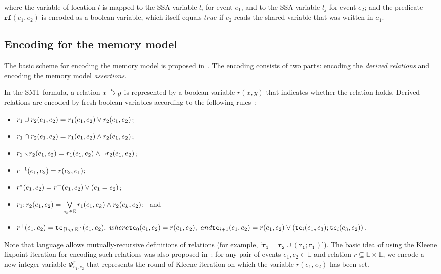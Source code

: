 where the variable of location $l$ is mapped to the SSA-variable $l_i$ for event $e_1$, and to the SSA-variable $l_j$ for event $e_2$; and the predicate $\texttt{rf}(e_1, e_2)$ is encoded as a boolean variable, which itself equals $true$ if $e_2$ reads the shared variable that was written in $e_1$.


\subsection{Encoding for the memory model} %
\label{ch:enc:bmc:wmm}

The basic scheme for encoding the memory model is proposed in~\cite{Porthos17a}.
The encoding consists of two parts: encoding the \textit{derived relations} and encoding the memory model \textit{assertions}.

In the SMT-formula, a relation $x \overset{\texttt{r}}{\rightarrow} y$ is represented by a boolean variable $r(x, y)$ that indicates whether the relation holds.
Derived relations are encoded by fresh boolean variables according to the following rules~\cite{Porthos17b}:
\begin{itemize}[noitemsep,topsep=0pt]
\item $r_1 \cup r_2(e_1, e_2) = r_1(e_1, e_2) \lor r_2(e_1, e_2)$;
\item $r_1 \cap r_2(e_1, e_2) = r_1(e_1, e_2) \land r_2(e_1, e_2)$;
\item $r_1 \!\smallsetminus\! r_2(e_1, e_2) = r_1(e_1, e_2) \land \neg r_2(e_1, e_2)$;
\item $r^{-1}(e_1, e_2) = r(e_2, e_1)$;
\item $r^{*}(e_1, e_2) = r^{+}(e_1, e_2) \lor (e_1 = e_2)$;
\item $r_1;r_2(e_1,e_2) = \bigvee\limits_{e_k \in \mathbb{E}}^{} r_1(e_1,e_k) \land r_2(e_k,e_2)$; \ and
\item $r^{+}(e_1, e_2) \defeq \texttt{tc}_{\left\lceil log|\mathbb{E}| \right\rceil} (e_1, e_2), \ where \vspace{0.25em} \\
\texttt{tc}_{0}(e_1,e_2) \defeq r(e_1,e_2), \ and \\
\texttt{tc}_{i+1}(e_1,e_2) \defeq r(e_1,e_2) \lor (\texttt{tc}_{i}(e_1,e_3);\texttt{tc}_{i}(e_3,e_2))$.
\end{itemize}
\vspace{1em}

Note that \cat{} language allows mutually-recursive definitions of relations (for example, `$\texttt{r}_\texttt{1} = \texttt{r}_\texttt{2} \cup (\texttt{r}_\texttt{1}; \texttt{r}_\texttt{1})$').
The basic idea of using the Kleene fixpoint iteration for encoding such relations was also proposed in~\cite{Porthos17a}: for any pair of events $e_1,e_2 \in \mathbb{E}$ and relation $r \subseteq \mathbb{E} \times \mathbb{E}$, we encode a new integer variable $\Phi_{e_1,e_2}^{r}$ that represents the round of Kleene iteration on which the variable $r(e_1, e_2)$ has been set.

